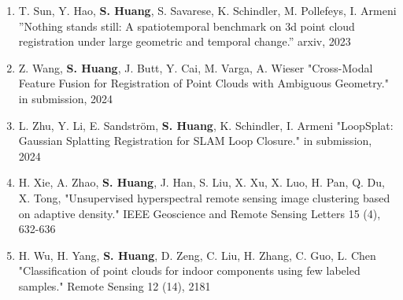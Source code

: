 \begin{enumerate}
    \item T. Sun, Y. Hao, \textbf{S. Huang}, S. Savarese, K. Schindler, M. Pollefeys, I. Armeni ”Nothing stands still: A spatiotemporal benchmark on 3d point cloud registration under large geometric and temporal change.” arxiv, 2023
    \item Z. Wang, \textbf{S. Huang}, J. Butt, Y. Cai, M. Varga, A. Wieser "Cross-Modal Feature Fusion for Registration of Point Clouds with Ambiguous Geometry." in submission, 2024
    \item L. Zhu, Y. Li, E. Sandström, \textbf{S. Huang}, K. Schindler, I. Armeni "LoopSplat: Gaussian Splatting Registration for SLAM Loop Closure." in submission, 2024
    \item H. Xie, A. Zhao, \textbf{S. Huang}, J. Han, S. Liu, X. Xu, X. Luo, H. Pan, Q. Du, X. Tong, "Unsupervised hyperspectral remote sensing image clustering based on adaptive density." IEEE Geoscience and Remote Sensing Letters 15 (4), 632-636
    \item H. Wu, H. Yang, \textbf{S. Huang}, D. Zeng, C. Liu, H. Zhang, C. Guo, L. Chen "Classification of point clouds for indoor components using few labeled samples." Remote Sensing 12 (14), 2181
\end{enumerate}